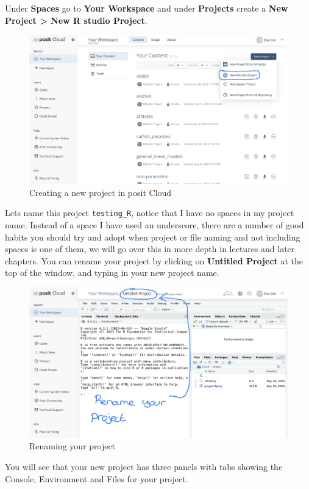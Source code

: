 \documentclass[
]{book}
\begin{document}
Under \textbf{Spaces} go to \textbf{Your Workspace} and under \textbf{Projects} create a \textbf{New Project \textgreater{} New R studio Project}.

\begin{figure}
\includegraphics[width=0.9\linewidth]{figures/posit2} \caption{Creating a new project in posit Cloud}\label{fig:unnamed-chunk-2}
\end{figure}

Lets name this project \texttt{testing\_R}, notice that I have no spaces in my project name. Instead of a space I have used an underscore, there are a number of good habits you should try and adopt when project or file naming and not including spaces is one of them, we will go over this in more depth in lectures and later chapters. You can rename your project by clicking on \textbf{Untitled Project} at the top of the window, and typing in your new project name.

\begin{figure}
\includegraphics[width=0.9\linewidth]{figures/posit3} \caption{Renaming your project}\label{fig:unnamed-chunk-3}
\end{figure}

You will see that your new project has three panels with tabs showing the Console, Environment and Files for your project.
\end{document}
